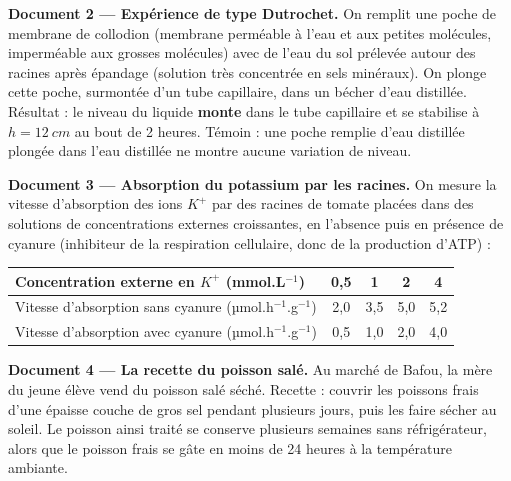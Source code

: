 \documentclass[11pt]{article}
\newcounter{popsec}
\newcounter{popsub}
\newcommand{\courssub}[1]{%
  \stepcounter{popsub}%
  \par\vspace{9pt}\noindent{\popxbold\fontsize{11.5}{13}\selectfont\color{popink}{\color{poporange}\thepopsec.\thepopsub}\hspace{6pt}#1}\par\nopagebreak\vspace{4pt}
}
\begin{document}
\textbf{Document 2 — Expérience de type Dutrochet.} On remplit une poche de membrane de collodion (membrane perméable à l'eau et aux petites molécules, imperméable aux grosses molécules) avec de l'eau du sol prélevée autour des racines après épandage (solution très concentrée en sels minéraux). On plonge cette poche, surmontée d'un tube capillaire, dans un bécher d'eau distillée. Résultat : le niveau du liquide \textbf{monte} dans le tube capillaire et se stabilise à $h = \SI{12}{cm}$ au bout de 2 heures. Témoin : une poche remplie d'eau distillée plongée dans l'eau distillée ne montre aucune variation de niveau.

\textbf{Document 3 — Absorption du potassium par les racines.} On mesure la vitesse d'absorption des ions $K^{+}$ par des racines de tomate placées dans des solutions de concentrations externes croissantes, en l'absence puis en présence de cyanure (inhibiteur de la respiration cellulaire, donc de la production d'ATP) :

\begin{center}
\begin{tabular}{|l|c|c|c|c|}
\hline
\rowcolor{popblueL}
Concentration externe en $K^{+}$ (mmol.L$^{-1}$) & 0,5 & 1 & 2 & 4 \\
\hline
Vitesse d'absorption sans cyanure (µmol.h$^{-1}$.g$^{-1}$) & 2,0 & 3,5 & 5,0 & 5,2 \\
\hline
Vitesse d'absorption avec cyanure (µmol.h$^{-1}$.g$^{-1}$) & 0,5 & 1,0 & 2,0 & 4,0 \\
\hline
\end{tabular}
\end{center}

\textbf{Document 4 — La recette du poisson salé.} Au marché de Bafou, la mère du jeune élève vend du poisson salé séché. Recette : couvrir les poissons frais d'une épaisse couche de gros sel pendant plusieurs jours, puis les faire sécher au soleil. Le poisson ainsi traité se conserve plusieurs semaines sans réfrigérateur, alors que le poisson frais se gâte en moins de 24 heures à la température ambiante.

\courssub{Consignes}
\end{document}
